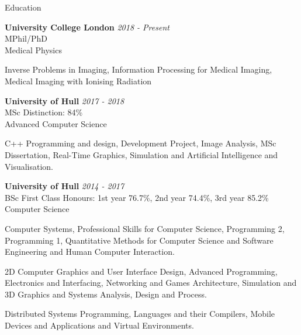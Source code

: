 \documentclass{cv}
\begin{document}
\begin{rSection}{Education}

{\bf University College London} \hfill {\em 2018 - Present} 
\\ MPhil/PhD
\\ Medical Physics

\item Inverse Problems in Imaging, Information Processing for Medical Imaging, Medical Imaging with Ionising Radiation

{\bf University of Hull} \hfill {\em 2017 - 2018} 
\\ MSc \hfill {Distinction: 84\%}
\\ Advanced Computer Science

\item C++ Programming and design, Development Project, Image Analysis, MSc Dissertation, Real-Time Graphics, Simulation and Artificial Intelligence and Visualisation.

{\bf University of Hull} \hfill {\em 2014 - 2017} 
\\ BSc \hfill {First Class Honours: 1st year 76.7\%, 2nd year 74.4\%, 3rd year 85.2\%}
\\ Computer Science

\item Computer Systems, Professional Skills for Computer Science, Programming 2, Programming 1, Quantitative Methods for Computer Science and Software Engineering and Human Computer Interaction.

\item 2D Computer Graphics and User Interface Design, Advanced Programming, Electronics and Interfacing, Networking and Games Architecture, Simulation and 3D Graphics and Systems Analysis, Design and Process.

\item Distributed Systems Programming, Languages and their Compilers, Mobile Devices and Applications and Virtual Environments.

\end{rSection}

\end{document}
